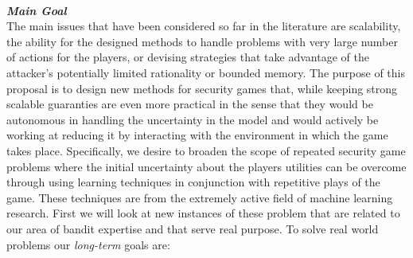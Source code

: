 

\noindent \textit{\textbf{\\Main Goal}}\\
The main issues that have been considered so far in the literature are scalability, the ability for the designed methods to handle problems with very large number of actions for the players, or devising strategies that take advantage of the attacker's potentially limited rationality or bounded memory\cite{tambe2012game}.
The purpose of this proposal is to design new methods for security games that, while keeping strong scalable guaranties are even more practical  in the sense that they would be autonomous in handling the uncertainty in the model and would actively be working at reducing it by interacting with the environment in which the game takes place. Specifically, we desire to broaden the scope of repeated security game problems where the initial uncertainty about the players utilities can be overcome through using learning techniques  in conjunction with  repetitive plays of the game. These techniques are from the extremely active field of machine learning research.
First we will look at new instances of these problem that are related to our area of bandit expertise and that serve real purpose.
To solve real world problems our \textit{long-term} goals are:

